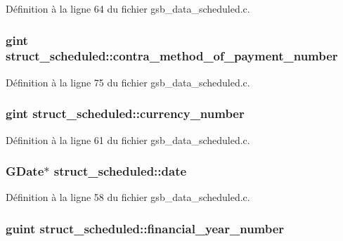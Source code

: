 Définition à la ligne 64 du fichier gsb\_\-data\_\-scheduled.c.

\subsubsection[{contra\_\-method\_\-of\_\-payment\_\-number}]{\setlength{\rightskip}{0pt plus 5cm}gint {\bf struct\_\-scheduled::contra\_\-method\_\-of\_\-payment\_\-number}}\label{structstruct__scheduled_ac859176483da9ccf215d412b373abecc}


Définition à la ligne 75 du fichier gsb\_\-data\_\-scheduled.c.

\subsubsection[{currency\_\-number}]{\setlength{\rightskip}{0pt plus 5cm}gint {\bf struct\_\-scheduled::currency\_\-number}}\label{structstruct__scheduled_a127e5d43a83d88d0ec3763bec2147a27}


Définition à la ligne 61 du fichier gsb\_\-data\_\-scheduled.c.

\subsubsection[{date}]{\setlength{\rightskip}{0pt plus 5cm}GDate$\ast$ {\bf struct\_\-scheduled::date}}\label{structstruct__scheduled_ad21d1c830cbdad9697adff64205c2c87}


Définition à la ligne 58 du fichier gsb\_\-data\_\-scheduled.c.

\subsubsection[{financial\_\-year\_\-number}]{\setlength{\rightskip}{0pt plus 5cm}guint {\bf struct\_\-scheduled::financial\_\-year\_\-number}}\label{structstruct__scheduled_a3ab93527ad255402690386e2c40ac1c5}


